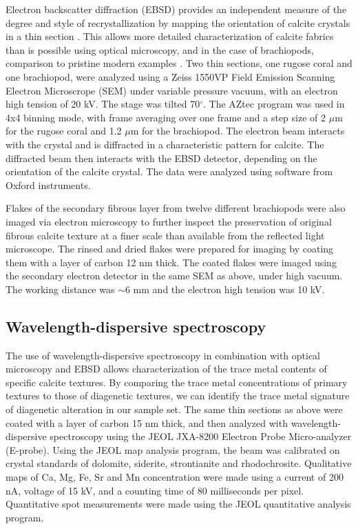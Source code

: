 \documentclass[5p, authoryear]{elsarticle}
\begin{document}
Electron backscatter diffraction (EBSD) provides an independent measure of the degree and style of recrystallization by mapping the orientation of calcite crystals in a thin section \citep[e.g.][]{Bergmann2013}. This allows more detailed characterization of calcite fabrics than is possible using optical microscopy, and in the case of brachiopods, comparison to pristine modern examples \citep{PerezHuerta2007}. Two thin sections, one rugose coral and one brachiopod, were analyzed using a Zeiss 1550VP Field Emission Scanning Electron Microscrope (SEM) under variable pressure vacuum, with an electron high tension of 20 kV. The stage was tilted 70$^{\circ}$. The AZtec program was used in 4x4 binning mode, with frame averaging over one frame and a step size of 2 $\mu$m for the rugose coral and 1.2 $\mu$m for the brachiopod. The electron beam interacts with the crystal and is diffracted in a characteristic pattern for calcite. The diffracted beam then interacts with the EBSD detector, depending on the orientation of the calcite crystal. The data were analyzed using software from Oxford instruments.

Flakes of the secondary fibrous layer from twelve different brachiopods were also imaged via electron microscopy to further inspect the preservation of original fibrous calcite texture at a finer scale than available from the reflected light microscope. The rinsed and dried flakes were prepared for imaging by coating them with a layer of carbon 12 nm thick. The coated flakes were imaged using the secondary electron detector in the same SEM as above, under high vacuum. The working distance was $\sim$6 mm and the electron high tension was 10 kV.

\subsection{Wavelength-dispersive spectroscopy}

The use of wavelength-dispersive spectroscopy in combination with optical microscopy and EBSD allows characterization of the trace metal contents of specific calcite textures. By comparing the trace metal concentrations of primary textures to those of diagenetic textures, we can identify the trace metal signature of diagenetic alteration in our sample set. The same thin sections as above were coated with a layer of carbon 15 nm thick, and then analyzed with wavelength-dispersive spectroscopy using the JEOL JXA-8200 Electron Probe Micro-analyzer (E-probe). Using the JEOL map analysis program, the beam was calibrated on crystal standards of dolomite, siderite, strontianite and rhodochrosite. Qualitative maps of Ca, Mg, Fe, Sr and Mn concentration were made using a current of 200 nA, voltage of 15 kV, and a counting time of 80 milliseconds per pixel. Quantitative spot measurements were made using the JEOL quantitative analysis program. 
\end{document}
